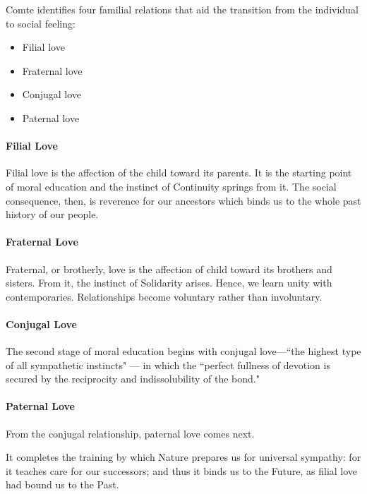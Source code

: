 Comte identifies four familial relations that aid the transition from the individual to social feeling:

\begin{itemize}
\item Filial love 
\item Fraternal love 
\item Conjugal love 
\item Paternal love 
\end{itemize}
\paragraph{Filial Love}
Filial love is the affection of the child toward its parents. It is the starting point of moral education and the instinct of Continuity springs from it. The social consequence, then, is reverence for our ancestors which binds us to the whole past history of our people.

\paragraph{Fraternal Love}
Fraternal, or brotherly, love is the affection of child toward its brothers and sisters. From it, the instinct of Solidarity arises. Hence, we learn unity with contemporaries. Relationships become voluntary rather than involuntary.

\paragraph{Conjugal Love}
The second stage of moral education begins with conjugal love—``the highest type of all sympathetic instincts" — in which the ``perfect fullness of devotion is secured by the reciprocity and indissolubility of the bond."

\paragraph{Paternal Love}
From the conjugal relationship, paternal love comes next.

\begin{quotex}
It completes the training by which Nature prepares us for universal sympathy: for it teaches care for our successors; and thus it binds us to the Future, as filial love had bound us to the Past. 

\end{quotex}


